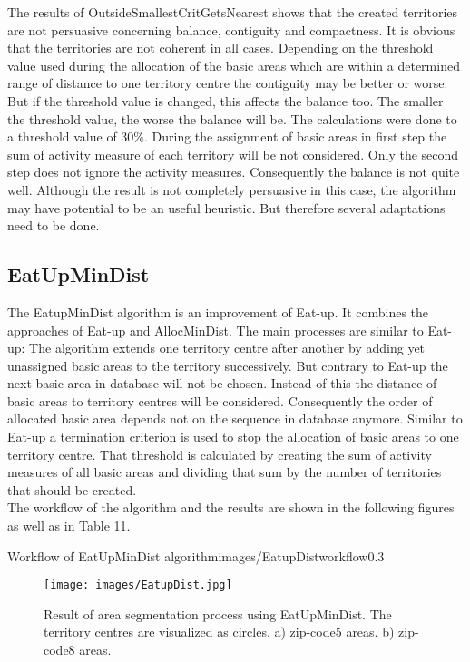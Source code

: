 The results of OutsideSmallestCritGetsNearest shows that the created territories are not persuasive concerning balance, contiguity and compactness. It is obvious that the territories are not coherent in all cases. Depending on the threshold value used during the allocation of the basic areas which are within a determined range of distance to one territory centre the contiguity may be better or worse. But if the threshold value is changed, this affects the balance too. The smaller the threshold value, the worse the balance will be. The calculations were done to a threshold value of 30\%. During the assignment of basic areas in first step the sum of activity measure of each territory will be not considered. Only the second step does not ignore the activity measures. Consequently the balance is not quite well. Although the result is not completely persuasive in this case, the algorithm may have potential to be an useful heuristic. But therefore several adaptations need to be done.

\subsection{EatUpMinDist}
The EatupMinDist algorithm is an improvement of Eat-up. It combines the approaches of Eat-up and AllocMinDist. The main processes are similar to Eat-up: The algorithm extends one territory centre after another by adding yet unassigned basic areas to the territory successively. But contrary to Eat-up the next basic area in database will not be chosen. Instead of this the distance of basic areas to territory centres will be considered. Consequently the order of allocated basic area depends not on the sequence in database anymore. Similar to Eat-up a termination criterion is used to stop the allocation of basic areas to one territory centre. That threshold is calculated by creating the sum of activity measures of all basic areas and dividing that sum by the number of territories that should be created.\\
The workflow of the algorithm and the results are shown in the following figures as well as in Table 11.


\begin{figurevarSize}{Workflow of EatUpMinDist algorithm}{images/EatupDistworkflow}{0.3}\end{figurevarSize}

\begin{figure}[H]
	\centering
	\texttt{[image: images/EatupDist.jpg]}
	\caption[Result of area segmentation process using EatUpMinDist.]{Result of area segmentation process using EatUpMinDist. The territory centres are visualized as circles. a) zip-code5 areas. b) zip-code8 areas.}
\end{figure}

